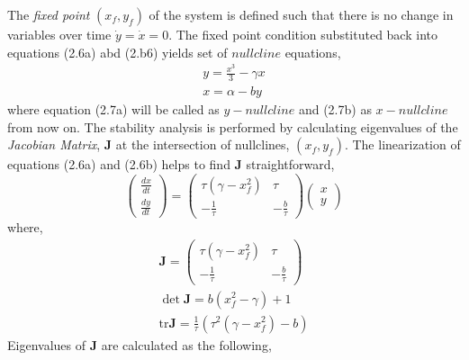 The \textit{fixed point} $(x_f, y_f)$ of the system is defined such that there is no change in variables over time $\dot{y} =\dot{x} = 0 $. The fixed point condition substituted back into equations (2.6a) abd (2.b6) yields set of $nullcline$ equations, 
\begin{subequations}
\begin{align}  y = \frac{x^3}{3} - \gamma x
              \label{eqn: frobenius 3}\\  
               x = \alpha - b y
               \label{eqn: frobenius 4}   \end{align} 
\end{subequations}
where equation (2.7a) will be called as $y-nullcline$ and (2.7b) as $x-nullcline$ from now on. The stability analysis is performed by calculating eigenvalues of the \textit{Jacobian Matrix}, \textbf{J} at the intersection of nullclines, $(x_f, y_f)$. The  linearization of equations (2.6a) and (2.6b) helps to find  \textbf{J} straightforward,
\begin{equation}
%
    \begin{pmatrix}
        \frac{dx}{dt} \\ \frac{dy}{dt}
     \end{pmatrix} = \begin{pmatrix}
        \tau(\gamma - x_f^2) & \tau \\
        -\frac{1}{\tau}     & -\frac{b}{\tau}
     \end{pmatrix}
    \begin{pmatrix}
        x \\
        y
    \end{pmatrix}
%
\end{equation}
where,
\begin{subequations}
\begin{align} \textbf{J} = \begin{pmatrix} \tau(\gamma - x_f^2) & \tau \\ -\frac{1}{\tau}     & -\frac{b}{\tau}   \end{pmatrix}
              \label{eqn: frobenius 5}\\  
 \det \textbf{J} =  b(x_f^2 - \gamma) +1
               \label{eqn: frobenius 6} \\   
\mathrm{tr} \textbf{J} =  \frac{1}{\tau}(\tau^2( \gamma - x_f^2 ) -b)
               \label{eqn: frobenius 7}                 
               \end{align} 
\end{subequations}
Eigenvalues of \textbf{J} are calculated as the following,
